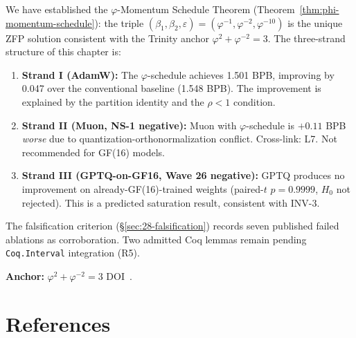 We have established the \(\varphi\)-Momentum Schedule Theorem
(Theorem~\ref{thm:phi-momentum-schedule}): the triple
\((\beta_1, \beta_2, \varepsilon) = (\varphi^{-1}, \varphi^{-2}, \varphi^{-10})\)
is the unique ZFP solution consistent with the Trinity anchor
\(\varphi^2 + \varphi^{-2} = 3\).  The three-strand structure
of this chapter is:

\begin{enumerate}
  \item \textbf{Strand I (AdamW):} The \(\varphi\)-schedule
        achieves 1.501 BPB, improving by 0.047 over the conventional
        baseline (1.548 BPB).  The improvement is explained by the
        partition identity and the $\rho < 1$ condition.

  \item \textbf{Strand II (Muon, NS-1 negative):} Muon with
        \(\varphi\)-schedule is $+0.11$ BPB \emph{worse} due to
        quantization-orthonormalization conflict.
        Cross-link: L7.  Not recommended for GF(16) models.

  \item \textbf{Strand III (GPTQ-on-GF16, Wave 26 negative):}
        GPTQ produces no improvement on already-GF(16)-trained weights
        (paired-$t$ $p = 0.9999$, $H_0$ not rejected).  This is a
        predicted saturation result, consistent with INV-3.
\end{enumerate}

The falsification criterion (§\ref{sec:28-falsification}) records
seven published failed ablations as corroboration.  Two admitted
Coq lemmas remain pending \texttt{Coq.Interval} integration (R5).

\textbf{Anchor:} \(\varphi^2 + \varphi^{-2} = 3\)
\quad DOI~\cite{zenodo_trinity_anchor}.

\section{References}\label{sec:28-references}

